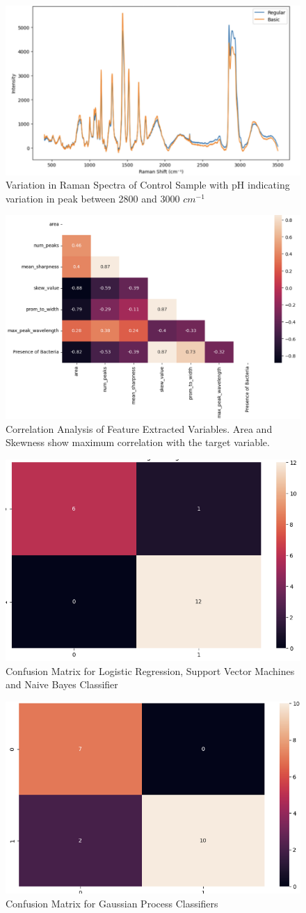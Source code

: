 \begin{figure}[h!]
    \centering
    \includegraphics[width=0.5\linewidth]{Figures/Screenshot 2025-07-16 at 2.27.24 PM.png}
    \caption{Variation in Raman Spectra of Control Sample with pH indicating variation in peak between 2800 and 3000 $cm^{-1}$}
    \label{fig:confusion}
\end{figure}

\begin{figure}
    \centering
    \includegraphics[width=0.5\linewidth]{Figures/Screenshot 2025-07-16 at 2.27.59 PM.png}
    \caption{Correlation Analysis of Feature Extracted Variables. Area and Skewness show maximum correlation with the target variable.}
    \label{fig:corr}
\end{figure}

\begin{figure}
    \centering
    \includegraphics[width=0.5\linewidth]{Figures/Screenshot 2025-07-16 at 2.28.32 PM.png}
    \caption{Confusion Matrix for Logistic Regression, Support Vector Machines and Naive Bayes Classifier}
    \label{fig:cm}
\end{figure}

\begin{figure}
    \centering
    \includegraphics[width=0.5\linewidth]{Figures/Screenshot 2025-07-16 at 2.28.53 PM.png}
    \caption{Confusion Matrix for Gaussian Process Classifiers}
    \label{fig:cm2}
\end{figure}


